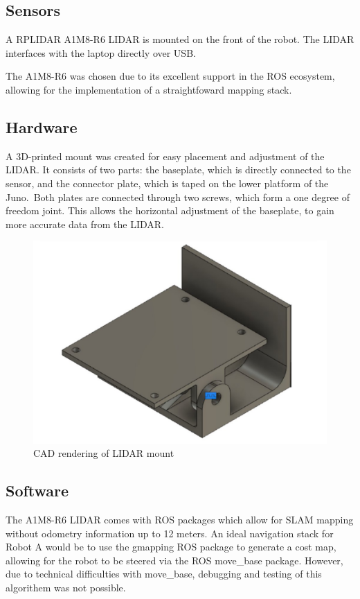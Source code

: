 \documentclass[11pt]{article}
\begin{document}
	\subsection{Sensors}
	A RPLIDAR A1M8-R6 LIDAR is mounted on the front of the robot. The LIDAR interfaces with the laptop directly over USB. \newline
	
	The A1M8-R6 was chosen due to its excellent support in the ROS ecosystem, allowing for the implementation of a straightfoward mapping stack. 
	
	\subsection{Hardware}
	A 3D-printed mount was created for easy placement and adjustment of the LIDAR. It consists of two parts: the baseplate, which is directly connected to the sensor, and the connector plate, which is taped on the lower platform of the Juno. Both plates are connected through two screws, which form a one degree of freedom joint. This allows the horizontal adjustment of the baseplate, to gain more accurate data from the LIDAR. 
	
	\begin{figure}[h!]
		\centering
		\includegraphics[scale=0.6]{lidar_mount}
		\caption{CAD rendering of LIDAR mount}
	\end{figure}
	
	\subsection{Software}
	The A1M8-R6 LIDAR comes with ROS packages which allow for SLAM mapping without odometry information up to 12 meters. An ideal navigation stack for Robot A would be to use the gmapping ROS package to generate a cost map, allowing for the robot to be steered via the ROS move\_base package. However, due to technical difficulties with move\_base, debugging and testing of this algorithem was not possible. \newline
	
\end{document}
